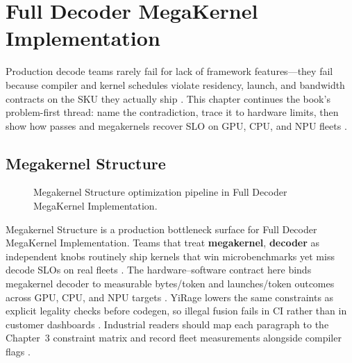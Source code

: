 \chapter{Full Decoder MegaKernel Implementation}
\label{chap:ch11}

Production decode teams rarely fail for lack of framework features---they fail because compiler and kernel schedules violate residency, launch, and bandwidth contracts on the SKU they actually ship \citep{patel2025llminference,nvidia2022hopper}. This chapter continues the book's problem-first thread: name the contradiction, trace it to hardware limits, then show how passes and megakernels recover SLO on GPU, CPU, and NPU fleets \citep{taxbreak2026,semianalysis2024tma}.

\section{Megakernel Structure}
\label{sec:megakernel_structure}
\begin{figure}[t]
\centering
{}
\caption{Megakernel Structure optimization pipeline in Full Decoder MegaKernel Implementation.}
\label{fig:megakernel_structure_pipeline}
\end{figure}


Megakernel Structure is a production bottleneck surface for Full Decoder MegaKernel Implementation. Teams that treat \textbf{megakernel}, \textbf{decoder} as independent knobs routinely ship kernels that win microbenchmarks yet miss decode SLOs on real fleets \citep{patel2025llminference,nvidia2022hopper}. The hardware--software contract here binds megakernel decoder to measurable bytes/token and launches/token outcomes across GPU, CPU, and NPU targets \citep{taxbreak2026,semianalysis2024tma}. YiRage lowers the same constraints as explicit legality checks before codegen, so illegal fusion fails in CI rather than in customer dashboards \citep{memoryfloor2026,amd2024xdna}. Industrial readers should map each paragraph to the Chapter~3 constraint matrix and record fleet measurements alongside compiler flags \citep{nvidia2022hopper,amd2024aie}.

